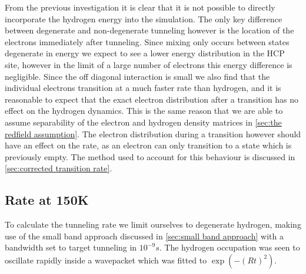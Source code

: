
From the previous investigation it is clear
that it is not possible to directly
incorporate the hydrogen energy
into the simulation.
The only key difference
between degenerate and
non-degenerate tunneling
however
is the location of the
electrons
immediately after
tunneling. Since
mixing only occurs
between states degenerate
in energy we expect
to see a lower energy
distribution in the
HCP site, however
in the
limit of a large
number of electrons
this energy
difference is negligible.
Since the off diagonal
interaction is small
we also find that the
individual electrons
transition at a much
faster rate than
hydrogen, and it is
reasonable
to expect that
the exact electron
distribution after a
transition has no effect
on the hydrogen dynamics.
This is the same reason that
we are able to assume separability
of the electron and hydrogen
density matrices in
\cref{sec:the redfield assumption}.
The electron distribution
during a transition however
should have an effect on the
rate, as an electron can
only transition to a state
which is previously
empty. The method used to
account for this behaviour
is discussed in
\cref{sec:corrected transition rate}.

\subsection{Rate at 150K}\label{sec:degenerate tunnelling simulaton}
To calculate the tunneling rate
we limit
ourselves to degenerate
hydrogen, making use of
the small band approach
discussed in \cref{sec:small band approach}
with a bandwidth set to target
tunneling in \(10^{-9}s\).
The hydrogen occupation
was seen to oscillate
rapidly inside a wavepacket
which was fitted to
\(\exp{(-{ (Rt)}^2)}\).

